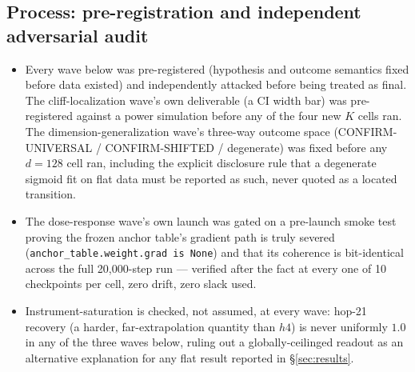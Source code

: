 \subsection{Process: pre-registration and independent adversarial audit}
\begin{itemize}
  \item Every wave below was pre-registered (hypothesis and outcome
    semantics fixed before data existed) and independently attacked before
    being treated as final. The cliff-localization wave's own deliverable
    (a CI width bar) was pre-registered against a power simulation before
    any of the four new $K$ cells ran. The dimension-generalization wave's
    three-way outcome space (CONFIRM-UNIVERSAL / CONFIRM-SHIFTED /
    degenerate) was fixed before any $d{=}128$ cell ran, including the
    explicit disclosure rule that a degenerate sigmoid fit on flat data
    must be reported as such, never quoted as a located transition.
  \item The dose-response wave's own launch was gated on a pre-launch smoke
    test proving the frozen anchor table's gradient path is truly severed
    (\texttt{anchor\_table.weight.grad is None}) and that its coherence is
    bit-identical across the full 20{,}000-step run --- verified after the
    fact at every one of 10 checkpoints per cell, zero drift, zero slack
    used.
  \item Instrument-saturation is checked, not assumed, at every wave: hop-21
    recovery (a harder, far-extrapolation quantity than $h4$) is never
    uniformly $1.0$ in any of the three waves below, ruling out a
    globally-ceilinged readout as an alternative explanation for any flat
    result reported in \S\ref{sec:results}.
\end{itemize}
